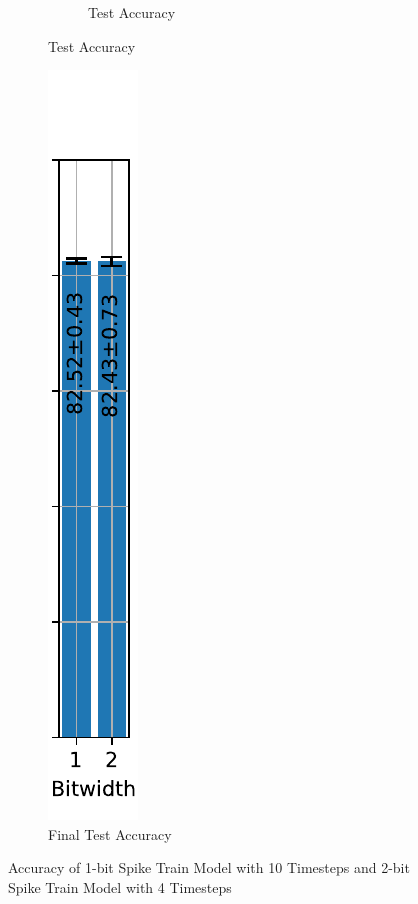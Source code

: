 \begin{figure}[H]
\begin{subfigure}[H]{0.89\textwidth}
\begin{subfigure}[H]{\textwidth}
                    \caption{Test Accuracy}
                \end{subfigure}
            \end{subfigure}
            \hfill
            \begin{subfigure}[H]{0.1\textwidth}
                \includegraphics[width=\textwidth]{../timesteps/FashionMNIST/plots/fashionmnist_final_acc.pdf}
                \caption{Final Test Accuracy}
            \end{subfigure}
            \caption{Accuracy of 1-bit Spike Train Model with 10 Timesteps and 2-bit Spike Train Model with 4 Timesteps}
        \end{figure}

